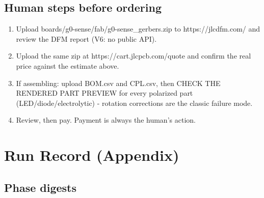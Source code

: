 \documentclass[11pt,a4paper]{article}
\begin{document}
\subsection*{Human steps before ordering}
\begin{enumerate}
\item Upload boards/g0-sense/fab/g0-sense\_gerbers.zip to https://jlcdfm.com/ and review the DFM report (V6: no public API).
\item Upload the same zip at https://cart.jlcpcb.com/quote and confirm the real price against the estimate above.
\item If assembling: upload BOM.csv and CPL.csv, then CHECK THE RENDERED PART PREVIEW for every polarized part (LED/diode/electrolytic) - rotation corrections are the classic failure mode.
\item Review, then pay. Payment is always the human's action.
\end{enumerate}
\section{Run Record (Appendix)}
\subsection*{Phase digests}
\end{document}
